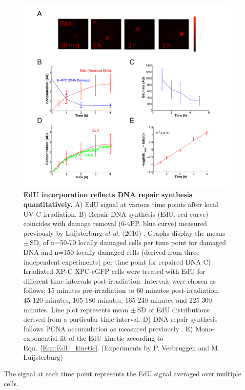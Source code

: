  \begin{figure}[t!]
\begin{center}
\includegraphics[width=1\textwidth]{Abbildungen/figure2_4.pdf}
\caption{\textbf{EdU incorporation reflects DNA repair synthesis quantitatively.} A) EdU signal at various time points after local UV-C irradiation. B) Repair DNA synthesis (EdU, red curve) coincides with damage removal (6-4PP, blue curve) measured previously by Luijsterburg \textit{et al.} (2010) \cite{Luijsterburg2010}. Graphs display the means $\pm$\,SD, of n=50-70 locally damaged cells per time point for damaged DNA and n=150 locally damaged cells (derived from three independent experiments) per time point for repaired DNA C) Irradiated XP-C XPC-eGFP cells were treated with EdU for different time intervals post-irradiation. Intervals were chosen as follows: 15 minutes pre-irradiation to 60 minutes post-irradiation, 45-120 minutes, 105-180 minutes, 165-240 minutes and 225-300 minutes. Line plot represents mean $\pm$\,SD of EdU distributions derived from a particular time interval. D) DNA repair synthesis follows PCNA accumulation as measured previously \cite{Luijsterburg2010}. E) Mono-exponential fit of the EdU kinetic according to Eqn.\ \ref{Eqn:EdU_kinetic}. (Experiments by P. Verbruggen and M. Luijsterburg)}
\label{fig:DNArepairKinetic}

\end{center}
\end{figure}
The signal at each time point represents the EdU signal averaged over multiple cells.\\
